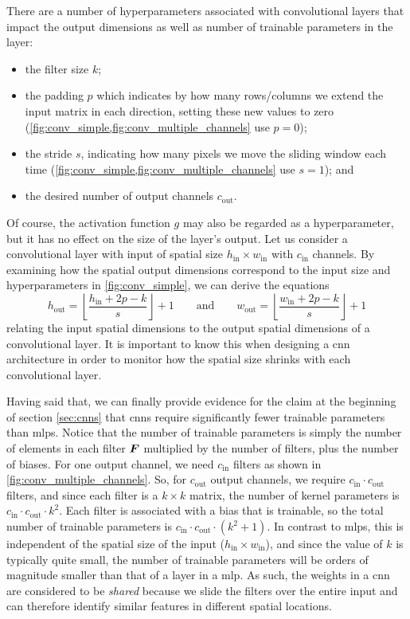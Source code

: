 \documentclass[../report.tex]{subfiles}
\begin{document}
There are a number of hyperparameters associated with convolutional layers that impact the output dimensions as well as number of trainable parameters in the layer:
\begin{itemize}
    \item the filter size $k$;
    \item the padding $p$ which indicates by how many rows/columns we extend the input matrix in each direction, setting these new values to zero (\cref{fig:conv_simple,fig:conv_multiple_channels} use $p=0$);
    \item the stride $s$, indicating how many pixels we move the sliding window each time (\cref{fig:conv_simple,fig:conv_multiple_channels} use $s=1$); and
    \item the desired number of output channels $c_\text{out}$.
\end{itemize}
Of course, the activation function $g$ may also be regarded as a hyperparameter, but it has no effect on the size of the layer's output.
Let us consider a convolutional layer with input of spatial size $h_\text{in} \times w_\text{in}$ with $c_\text{in}$ channels.
By examining how the spatial output dimensions correspond to the input size and hyperparameters in \cref{fig:conv_simple}, we can derive the equations
\begin{equation}
    \label{eq:cnn_output_size}
    h_\text{out} = \left\lfloor \frac{h_\text{in} + 2p - k }{s} \right\rfloor + 1 \qquad \text{and} \qquad
    w_\text{out} = \left\lfloor \frac{w_\text{in} + 2p - k }{s} \right\rfloor + 1
\end{equation}
relating the input spatial dimensions to the output spatial dimensions of a convolutional layer.
It is important to know this when designing a \gls{cnn} architecture in order to monitor how the spatial size shrinks with each convolutional layer.

Having said that, we can finally provide evidence for the claim at the beginning of section \cref{sec:cnns} that \glspl{cnn} require significantly fewer trainable parameters than \glspl{mlp}.
Notice that the number of trainable parameters is simply the number of elements in each filter ${\bm{F}}$ multiplied by the number of filters, plus the number of biases.
For one output channel, we need $c_\text{in}$ filters as shown in \cref{fig:conv_multiple_channels}.
So, for $c_\text{out}$ output channels, we require $c_\text{in} \cdot c_\text{out}$ filters, and since each filter is a $k \times k$ matrix, the number of kernel parameters is
$c_\text{in} \cdot c_\text{out} \cdot k^2$.
Each filter is associated with a bias that is trainable, so the total number of trainable parameters is 
$c_\text{in} \cdot c_\text{out} \cdot (k^2+1)$.
In contrast to \glspl{mlp}, this is independent of the spatial size of the input ($h_\text{in} \times w_\text{in}$), and since the value of $k$ is typically quite small, the number of trainable parameters will be orders of magnitude smaller than that of a layer in a \gls{mlp}.
As such, the weights in a \gls{cnn} are considered to be \emph{shared} because we slide the filters over the entire input and can therefore identify similar features in different spatial locations.
\end{document}
